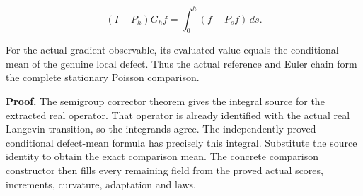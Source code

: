 \documentclass[11pt,a4paper]{report}
\begin{document}
\[(I-P_h)G_hf=\int_0^h(f-P_sf)\,ds.\]

For the actual gradient observable, its evaluated value equals the conditional mean of the genuine local defect. Thus the actual reference and Euler chain form the complete stationary Poisson comparison.



\textbf{Proof.} The semigroup corrector theorem gives the integral source for the extracted real operator. That operator is already identified with the actual real Langevin transition, so the integrands agree. The independently proved conditional defect-mean formula has precisely this integral. Substitute the source identity to obtain the exact comparison mean. The concrete comparison constructor then fills every remaining field from the proved actual scores, increments, curvature, adaptation and laws.
\end{document}
